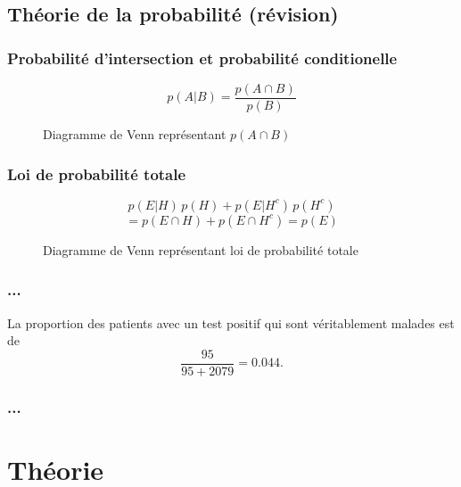 \documentclass{beamer}
\begin{document}
\subsection{Théorie de la probabilité (révision)}

\begin{frame}
    \frametitle{Probabilité d'intersection et probabilité conditionelle}

    \[p(A | B) = \frac{p(A \cap B)}{p(B)}\]

    \begin{figure}
    \centering
    
    \caption{Diagramme de Venn représentant $p(A \cap B)$}
    \end{figure}
\end{frame}


\begin{frame}
    \frametitle{Loi de probabilité totale}

    \[p(E | H) \, p(H) + p(E | H^c) \, p(H^c)\]
    \[ = p(E \cap H) + p(E \cap H^c) = p(E)\]

    \begin{figure}
    \centering
    
    \caption{Diagramme de Venn représentant loi de probabilité totale}
    \end{figure}
\end{frame}


\begin{frame}
    \frametitle{...}
    \begin{figure}
    \centering
      \scalebox{0.75}{}
    \end{figure}

    La proportion des patients avec un test positif qui sont véritablement malades est de
    \[\frac{95}{95 + 2079} = 0.044 .\]
\end{frame}


\begin{frame}
    \frametitle{...}
    \begin{figure}
    \centering
      \scalebox{0.75}{}
    \end{figure}
\end{frame}







\section{Théorie}
\end{document}
